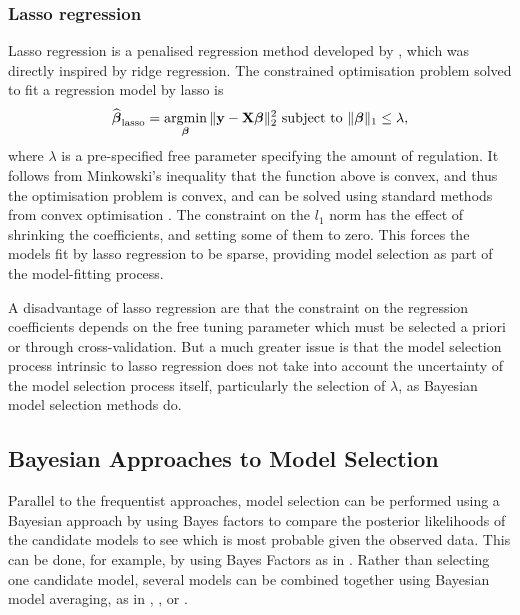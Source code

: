 \subsubsection{Lasso regression}
Lasso regression is a penalised regression method developed by \citep{Tibshirani1996}, which was directly
inspired by ridge regression. The constrained optimisation problem solved to fit a regression model by lasso
is
$$
\widehat{\vbeta}_{\text{lasso}} = \argmin_\vbeta \|\vy - \mX \vbeta\|_2^2 \text{ subject to } \|\vbeta\|_1 \leq \lambda,
$$
where $\lambda$ is a pre-specified free parameter specifying the amount of regulation.  It follows from
Minkowski's inequality that the function above is convex, and thus the optimisation problem is convex, and can
be solved using standard methods from convex optimisation \citep{Boyd2010}.  The constraint on the $l_1$ norm
has the effect of shrinking the coefficients, and setting some of them to zero. This forces the models fit by
lasso regression to be sparse, providing model selection as part of the model-fitting process.

A disadvantage of lasso regression are that the constraint on the regression coefficients depends on the free
tuning parameter which must be selected a priori or through cross-validation. But a much greater issue is that
the model selection process intrinsic to lasso regression does not take into account the uncertainty of the
model selection process itself, particularly the selection of $\lambda$, as Bayesian model selection methods do.

\subsection{Bayesian Approaches to Model Selection}
Parallel to the frequentist approaches, model selection can be performed using a Bayesian approach by using
Bayes factors to compare the posterior likelihoods of the candidate models to see which is most probable given
the observed data. This can be done, for example, by using Bayes Factors as in \citep{Kass1993}. Rather than
selecting one candidate model, several models can be combined together using Bayesian model  averaging, as in
\citep{Hoeting1999}, \citep{Raftery1997}, \citep{Fernandez2001} or \citep{Papaspiliopoulos2016}.

